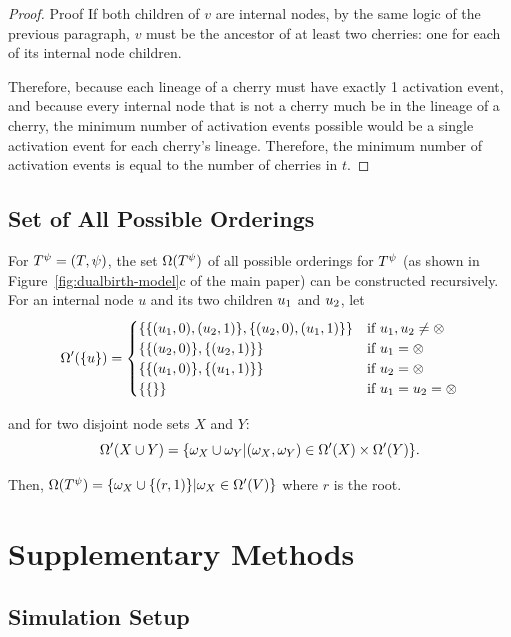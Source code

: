\begin{proof}{Proof}
If both children of $v$ are internal nodes, by the same logic of the previous paragraph, $v$ must be the ancestor of at least two cherries: one for each of its internal node children.

Therefore, because each lineage of a cherry must have exactly 1 activation event, and because every internal node that is not a cherry much be in the lineage of a cherry, the minimum number of activation events possible would be a single activation event for each cherry's lineage. Therefore, the minimum number of activation events is equal to the number of cherries in $t$.
\end{proof}

\subsection{Set of All Possible Orderings}
For $T^\psi =(T,\psi)$, the set $\Omega(T^\psi)$ of all possible orderings for $T^\psi$ (as shown in Figure~\ref{fig:dualbirth-model}c of the main paper) can be constructed recursively. For an internal node $u$ and its two children $u_{1}$ and $u_{2}$, let
\begin{equation*}
\Omega'(\{u\}) =
\begin{cases}
\{\{(u_{1},0),(u_{2},1)\},\{(u_{2},0),(u_{1},1)\}\}
&  \text{if } u_{1},u_{2}\neq \otimes \\
\{\{(u_{2},0)\},\{(u_{2},1)\}\} 
& \text{if } u_{1}= \otimes\\
\{\{(u_{1},0)\},\{(u_{1},1)\} \}
& \text{if } u_{2}= \otimes\\
\{\{\}\} &  \text{if } u_{1}=u_{2}= \otimes 
\end{cases}
\end{equation*}
\begin{small}
and for two disjoint node sets $X$ and $Y$:
\begin{equation}\label{sup:eq:sdall} %
\SDALL'(X\cup Y) = \{\SD_X \cup \SD_Y| (\SD_X,\SD_Y ) \in \SDALL'(X) \times \SDALL'(Y)\}.
\end{equation}
\end{small}
Then, $\Omega(T^\psi)=\{\omega_X\cup\{(r,1)\} | \omega_X\in \Omega'(V)\}$ where $r$ is the root.

\section{Supplementary Methods}
\subsection{Simulation Setup}\label{sup:simsetup}

